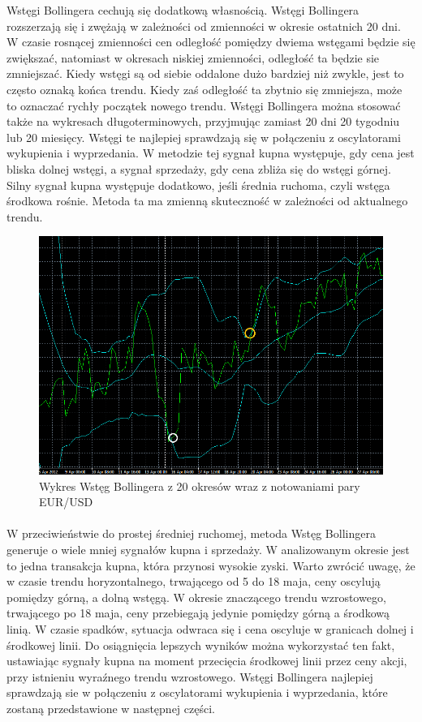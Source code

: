 \documentclass[pdflatex,11pt]{aghdpl}
\begin{document}
Wstęgi Bollingera cechują się dodatkową własnością. Wstęgi Bollingera rozszerzają się i zwężają w zależności od zmienności w okresie ostatnich 20 dni. W czasie rosnącej zmienności cen odległość pomiędzy dwiema wstęgami będzie się zwiększać, natomiast w okresach niskiej zmienności, odległość ta będzie sie zmniejszać. Kiedy wstęgi są od siebie oddalone dużo bardziej niż zwykle, jest to często oznaką końca trendu. Kiedy zaś odległość ta zbytnio się zmniejsza, może to oznaczać rychły początek nowego trendu\cite{5}. Wstęgi Bollingera można stosować także na wykresach długoterminowych, przyjmując zamiast 20 dni 20 tygodniu lub 20 miesięcy. Wstęgi te najlepiej sprawdzają się w połączeniu z oscylatorami wykupienia i wyprzedania. W metodzie tej sygnał kupna występuje, gdy cena jest bliska dolnej wstęgi, a sygnał sprzedaży, gdy cena zbliża się do wstęgi górnej. Silny sygnał kupna występuje dodatkowo, jeśli średnia ruchoma, czyli wstęga środkowa rośnie. Metoda ta ma zmienną skuteczność w zależności od aktualnego trendu.
\begin{figure}[ht]
\begin{center}
\includegraphics[width=15cm]{bb.png}
\caption{Wykres Wstęg Bollingera z 20 okresów wraz z notowaniami pary EUR/USD}
\label{bb}
\end{center}
\end{figure}
\paragraph{}
W przeciwieństwie do prostej średniej ruchomej, metoda Wstęg Bollingera generuje o wiele mniej sygnałów kupna i sprzedaży. W analizowanym okresie jest to jedna transakcja kupna, która przynosi wysokie zyski. Warto zwrócić uwagę, że w czasie trendu horyzontalnego, trwającego od 5 do 18 maja, ceny oscylują pomiędzy górną, a dolną wstęgą. W okresie znaczącego trendu wzrostowego, trwającego po 18 maja, ceny przebiegają jedynie pomiędzy górną a środkową linią. W czasie spadków, sytuacja odwraca się i cena oscyluje w granicach dolnej i środkowej linii. Do osiągnięcia lepszych wyników można wykorzystać ten fakt, ustawiając sygnały kupna na moment przecięcia środkowej linii przez ceny akcji, przy istnieniu wyraźnego trendu wzrostowego. Wstęgi Bollingera najlepiej sprawdzają sie w połączeniu z oscylatorami wykupienia i wyprzedania, które zostaną przedstawione w następnej części.
\end{document}
